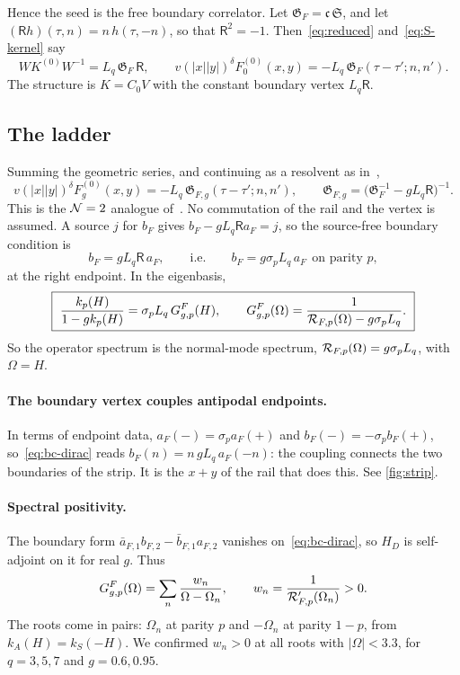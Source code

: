 Hence the seed is the free boundary correlator. Let $\mathfrak G_F=\mathfrak c\,\mathfrak S$, and let $(\mathsf R h)(\tau,n)=n\,h(\tau,-n)$, so that $\mathsf R^2=-1$. Then~\eqref{eq:reduced} and~\eqref{eq:S-kernel} say
\begin{equation}\label{eq:K-G}
WK^{(0)}W^{-1}=L_q\,\mathfrak G_F\,\mathsf R,\qquad v(|x||y|)^\delta F_0^{(0)}(x,y)=-L_q\,\mathfrak G_F(\tau-\tau';n,n').
\end{equation}
The structure is $K=C_0V$ with the constant boundary vertex $L_q\mathsf R$.

\subsection{The ladder}

Summing the geometric series, and continuing as a resolvent as in~\cite{Thong:2026},
\begin{equation}\label{eq:ladder-position}
v(|x||y|)^\delta F_g^{(0)}(x,y)=-L_q\,\mathfrak G_{F,g}(\tau-\tau';n,n'),\qquad\mathfrak G_{F,g}=\big(\mathfrak G_F^{-1}-gL_q\mathsf R\big)^{-1}.
\end{equation}
This is the $\mathcal{N}=2$ analogue of~\cite[(3.11)]{Thong:2026}. No commutation of the rail and the vertex is assumed. A source $j$ for $b_F$ gives $b_F-gL_q\mathsf Ra_F=j$, so the source-free boundary condition is
\begin{equation}\label{eq:bc-dirac}
b_F=gL_q\mathsf R\,a_F,\qquad\text{i.e.}\qquad b_F=g\sigma_pL_q\,a_F\ \ \text{on parity }p,
\end{equation}
at the right endpoint. In the eigenbasis,
\begin{equation}\label{eq:ladder-dirac}
\boxed{\ \frac{k_p(H)}{1-gk_p(H)}=\sigma_pL_q\,G^F_{g,p}(H),\qquad G^F_{g,p}(\Omega)=\frac{1}{\mathcal{R}_{F,p}(\Omega)-g\sigma_pL_q}.\ }
\end{equation}
So the operator spectrum is the normal-mode spectrum, $\mathcal{R}_{F,p}(\Omega)=g\sigma_pL_q$, with $\Omega=H$.

\paragraph{The boundary vertex couples antipodal endpoints.} In terms of endpoint data, $a_F(-)=\sigma_pa_F(+)$ and $b_F(-)=-\sigma_pb_F(+)$, so~\eqref{eq:bc-dirac} reads $b_F(n)=n\,gL_q\,a_F(-n)$: the coupling connects the two boundaries of the strip. It is the $x+y$ of the rail that does this. See \cref{fig:strip}.

\paragraph{Spectral positivity.} The boundary form $\bar a_{F,1}b_{F,2}-\bar b_{F,1}a_{F,2}$ vanishes on~\eqref{eq:bc-dirac}, so $H_D$ is self-adjoint on it for real $g$. Thus
\begin{equation}\label{eq:spectral}
G^F_{g,p}(\Omega)=\sum_n\frac{w_n}{\Omega-\Omega_n},\qquad w_n=\frac{1}{\mathcal{R}_{F,p}'(\Omega_n)}>0.
\end{equation}
The roots come in pairs: $\Omega_n$ at parity $p$ and $-\Omega_n$ at parity $1-p$, from $k_A(H)=k_S(-H)$. We confirmed $w_n>0$ at all roots with $|\Omega|<3.3$, for $q=3,5,7$ and $g=0.6,0.95$.

